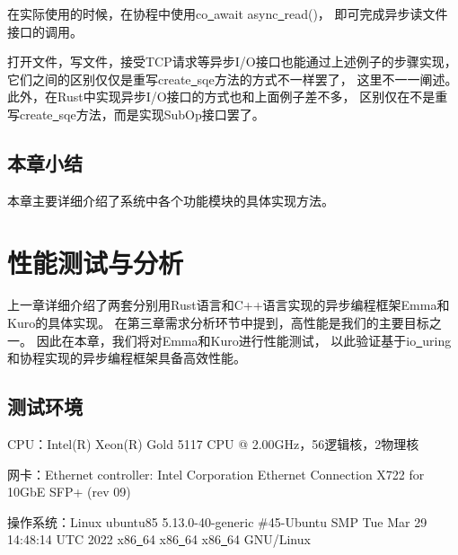 \documentclass[supercite]{HustGraduPaper}
\theoremstyle{definition}
\begin{document}
在实际使用的时候，在协程中使用co\underline{~}await async\underline{~}read()，
即可完成异步读文件接口的调用。\par

打开文件，写文件，接受TCP请求等异步I/O接口也能通过上述例子的步骤实现，
它们之间的区别仅仅是重写create\underline{~}sqe方法的方式不一样罢了，
这里不一一阐述。此外，在Rust中实现异步I/O接口的方式也和上面例子差不多，
区别仅在不是重写create\underline{~}sqe方法，而是实现SubOp接口罢了。\par

\subsection{本章小结}

本章主要详细介绍了系统中各个功能模块的具体实现方法。\par

\section{性能测试与分析}
上一章详细介绍了两套分别用Rust语言和C++语言实现的异步编程框架Emma和Kuro的具体实现。
在第三章需求分析环节中提到，高性能是我们的主要目标之一。
因此在本章，我们将对Emma和Kuro进行性能测试，
以此验证基于io\underline{~}uring和协程实现的异步编程框架具备高效性能。\par

\subsection{测试环境}
CPU：Intel(R) Xeon(R) Gold 5117 CPU @ 2.00GHz，56逻辑核，2物理核\par

网卡：Ethernet controller: Intel Corporation Ethernet Connection X722 for 10GbE SFP+ (rev 09)\par

操作系统：Linux ubuntu85 5.13.0-40-generic \#45-Ubuntu SMP Tue Mar 29 14:48:14 UTC 2022 x86\underline{~}64 x86\underline{~}64 x86\underline{~}64 GNU/Linux\par
\end{document}
